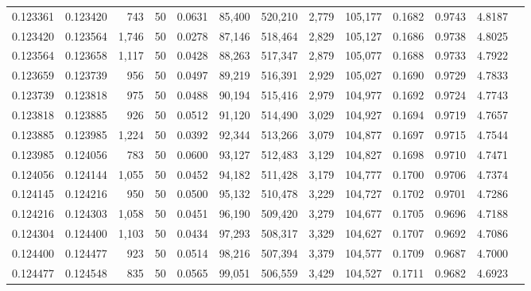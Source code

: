 \begin{tabular}{rrrrrrrrrrrrr}
0.123361 & 0.123420 &   743 &  50 &                                     0.0631 &  85,400 & 520,210 &   2,779 & 105,177 & 0.1682 & 0.9743 & 4.8187 \\
0.123420 & 0.123564 & 1,746 &  50 &                                     0.0278 &  87,146 & 518,464 &   2,829 & 105,127 & 0.1686 & 0.9738 & 4.8025 \\
0.123564 & 0.123658 & 1,117 &  50 &                                     0.0428 &  88,263 & 517,347 &   2,879 & 105,077 & 0.1688 & 0.9733 & 4.7922 \\
0.123659 & 0.123739 &   956 &  50 &                                     0.0497 &  89,219 & 516,391 &   2,929 & 105,027 & 0.1690 & 0.9729 & 4.7833 \\
0.123739 & 0.123818 &   975 &  50 &                                     0.0488 &  90,194 & 515,416 &   2,979 & 104,977 & 0.1692 & 0.9724 & 4.7743 \\
0.123818 & 0.123885 &   926 &  50 &                                     0.0512 &  91,120 & 514,490 &   3,029 & 104,927 & 0.1694 & 0.9719 & 4.7657 \\
0.123885 & 0.123985 & 1,224 &  50 &                                     0.0392 &  92,344 & 513,266 &   3,079 & 104,877 & 0.1697 & 0.9715 & 4.7544 \\
0.123985 & 0.124056 &   783 &  50 &                                     0.0600 &  93,127 & 512,483 &   3,129 & 104,827 & 0.1698 & 0.9710 & 4.7471 \\
0.124056 & 0.124144 & 1,055 &  50 &                                     0.0452 &  94,182 & 511,428 &   3,179 & 104,777 & 0.1700 & 0.9706 & 4.7374 \\
0.124145 & 0.124216 &   950 &  50 &                                     0.0500 &  95,132 & 510,478 &   3,229 & 104,727 & 0.1702 & 0.9701 & 4.7286 \\
0.124216 & 0.124303 & 1,058 &  50 &                                     0.0451 &  96,190 & 509,420 &   3,279 & 104,677 & 0.1705 & 0.9696 & 4.7188 \\
0.124304 & 0.124400 & 1,103 &  50 &                                     0.0434 &  97,293 & 508,317 &   3,329 & 104,627 & 0.1707 & 0.9692 & 4.7086 \\
0.124400 & 0.124477 &   923 &  50 &                                     0.0514 &  98,216 & 507,394 &   3,379 & 104,577 & 0.1709 & 0.9687 & 4.7000 \\
0.124477 & 0.124548 &   835 &  50 &                                     0.0565 &  99,051 & 506,559 &   3,429 & 104,527 & 0.1711 & 0.9682 & 4.6923 \\

\end{tabular}
